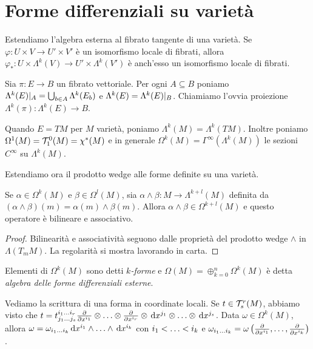 \section{Forme differenziali su varietà}

Estendiamo l'algebra esterna al fibrato tangente di una varietà.
Se $\varphi: U \times V \to U' \times V'$ è un isomorfismo locale di fibrati, allora $\varphi_* : U\times \Lambda^k(V) \to U' \times \Lambda^k(V')$ è anch'esso un isomorfismo locale di fibrati.

\begin{definition}
	Sia $\pi : E\to B$ un fibrato vettoriale. Per ogni $A\subseteq B$ poniamo $\Lambda^k(E)\restrict{A} = \bigcup_{b\in A} \Lambda^k(E_b)$ e $\Lambda^k(E) = \Lambda^k(E) \restrict B$.
	Chiamiamo l'ovvia proiezione $\Lambda^k(\pi) : \Lambda^k(E) \to B$.
\end{definition}

Quando $E = TM$ per $M$ varietà, poniamo $\Lambda^k(M) = \Lambda^k(TM)$. Inoltre poniamo $\Omega^1(M) = \Tau^0_1(M) = \chi^*(M)$ e in generale $\Omega^k(M) = \Gamma^\infty(\Lambda^k(M))$ le sezioni $C^\infty$ su $\Lambda^k(M)$.

Estendiamo ora il prodotto wedge alle forme definite su una varietà.
\begin{proposition}
	Se $\alpha \in \Omega^k(M)$ e $\beta \in \Omega^l(M)$, sia $\alpha \wedge \beta : M \to \Lambda^{k+l}(M)$ definita da $(\alpha\wedge\beta)(m) = \alpha(m) \wedge \beta(m)$. Allora $\alpha\wedge\beta \in \Omega^{k+l}(M)$ e questo operatore è bilineare e associativo.
\end{proposition}
\begin{proof}
	Bilinearità e associatività seguono dalle proprietà del prodotto wedge $\wedge$ in $\Lambda(T_mM)$. La regolarità si mostra lavorando in carta.
\end{proof}

\begin{definition}  
	Elementi di $\Omega^k(M)$ sono detti \emph{$k$-forme} e $\Omega(M) = \oplus_{k=0}^n \Omega^k(M)$ è detta \emph{algebra delle forme differenziali esterne}.
\end{definition}

\begin{remark}
Vediamo la scrittura di una forma in coordinate locali. Se $t\in\Tau^r_s(M)$, abbiamo visto che $t = t^{\seqb ir{}}_{\seqb js{}} \DerParz{}{x^{i_1}} \otimes \ldots \otimes \DerParz{}{x^{i_r}} \otimes \de x^{j_1} \otimes \ldots \otimes \de x^{j_s}$.
Data $\omega \in \Omega^k(M)$, allora $\omega = \omega_{\seqb ik{}} \de x^{i_1} \wedge \ldots \wedge \de x^{i_k}$ con $\seqb ik<$ e $\omega_{\seqb ik{}} = \omega\left(\DerParz{}{x^{i_1}}, \ldots, \DerParz{}{x^{i_k}}\right)$.
\end{remark}

